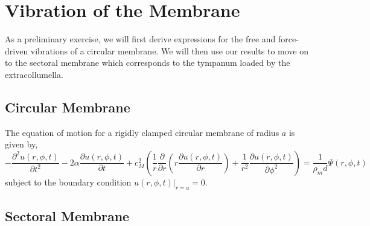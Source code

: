 \section{Vibration of the Membrane}
As a preliminary exercise, we will first derive expressions for the free and force-driven
vibrations of a circular membrane. We will then use our results to move on to the sectoral membrane 
which corresponds to the tympanum loaded by the extracollumella.
\subsection{Circular Membrane}
The equation of motion for a rigidly clamped circular membrane of radius $a$ is given by,
\begin{equation}\label{membraneequation1}
 -\frac{\partial^2 u(r,\phi,t)}{\partial t^2}-2\alpha\frac{\partial u(r,\phi,t)}{\partial t}+c^2_M\left(\frac{1}{r}\frac{\partial}{\partial r}\left(r\frac{\partial u(r,\phi,t)}{\partial r}\right)
 +\frac{1}{r^2}\frac{\partial u(r,\phi,t)}{\partial \phi^2}\right)=\frac{1}{\rho_m d}\Psi(r,\phi,t)
\end{equation}
subject to the boundary condition $u(r,\phi,t)|_{r=a}=0$.
\subsection{Sectoral Membrane}